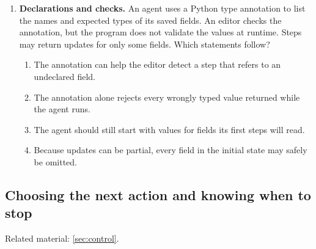 \begin{enumerate}[start=11,itemsep=0.7\baselineskip]
\item\label{exercise:20} \begin{minipage}[t]{\linewidth}
\textbf{Declarations and checks.} An agent uses a Python type annotation to list the names and expected types of its saved fields. An editor checks the annotation, but the program does not validate the values at runtime. Steps may return updates for only some fields. Which statements follow?
\begin{enumerate}[label=\textnormal{(\Alph*)},leftmargin=*,itemsep=0pt]
\item The annotation can help the editor detect a step that refers to an undeclared field.
\item The annotation alone rejects every wrongly typed value returned while the agent runs.
\item The agent should still start with values for fields its first steps will read.
\item Because updates can be partial, every field in the initial state may safely be omitted.
\end{enumerate}
\end{minipage}

\end{enumerate}

\subsection{Choosing the next action and knowing when to stop}
\noindent Related material: \cref{sec:control}.

